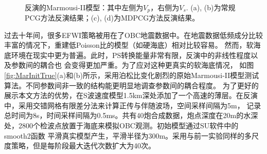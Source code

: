 \begin{figure}[!htb]
    \begin{center}
		\\
        \caption{
			反演的Marmousi-II模型：其中左侧为$V_p$，右侧为$V_s$. (a), (b)为常规PCG方法反演结果；(c), (d)为MDPCG方法反演结果。
    }
    \label{fig:MarInvert}
    \end{center}
\end{figure}
过去十年间，很多EFWI策略被用在了OBC地震数据中。在地震数据低频成分比较丰富的情况下，重建低Poisson比的模型（如硬海底）相对比较容易\cite[]{bae:2012}。
然而，软海底环境在现实中更为普遍。此时，PS转换能量非常有限，反演中的非线性程度以及参数间的耦合也
会变得更加严重。为了应对这种更真实的软海底情况，
如图\ref{fig:MarInitTrue}(a)和(b)所示，采用泊松比变化剧烈的原始Marmousi-II模型测试算法。不同参数间非一致的结构能更明显地调查参数间的耦合程度。
为了更好的展示本文方法的优势，在S波速度模型1.5km深处添加了一个高速的薄层。在反演中，采用交错网格有限差分法来计算正传与伴随波场，空间采样间隔为5m，
记录总时间为8s，时间采样间隔为0.5ms。共有40炮合成数据，炮点深度在20m的水深处，2800个检波点放置于海底来模拟OBC观测。初始模型通过SU软件中的smooth2函数
平滑真实模型产生，平滑半径为300m。采用与前一实验同样的多尺度策略，但是每阶段最大迭代次数扩大为40次。


